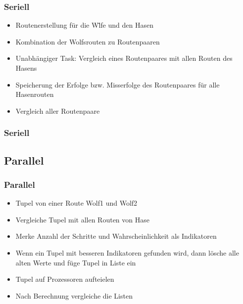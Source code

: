 \documentclass{beamer}
\begin{document}
\begin{frame}
\frametitle{Seriell}
\begin{itemize}
\item Routenerstellung für die W\"lfe und den Hasen
\item Kombination der Wolfsrouten zu Routenpaaren
\item Unabh\"angiger Task: Vergleich eines Routenpaares mit allen Routen des Hasens
\item Speicherung der Erfolge bzw. Misserfolge des Routenpaares für alle Hasenrouten
\item Vergleich aller Routenpaare
\end{itemize}
\end{frame}



\begin{frame}
\begin{algorithm}[H]
\frametitle{Seriell}
 {
 }
\end{algorithm}
\end{frame}

\subsection{Parallel}
\begin{frame}
\frametitle{Parallel}
\begin{itemize}
\item Tupel von einer Route Wolf1 und Wolf2
\item Vergleiche Tupel mit allen Routen von Hase
\item Merke Anzahl der Schritte und Wahrscheinlichkeit als Indikatoren
\item Wenn ein Tupel mit besseren Indikatoren gefunden wird, dann l\"osche alle alten Werte und f\"uge Tupel in Liste ein

\item Tupel auf Prozessoren aufteielen
\item Nach Berechnung vergleiche die Listen
\end{itemize}
\end{frame}
\end{document}
